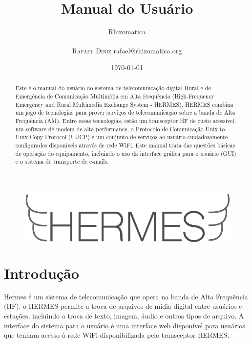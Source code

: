 \documentclass[11pt,a4paper]{article}
\title{Manual do Usuário}
\author{
       \large
       \mbox{Rhizomatica} \\
       \mbox{}\\
       \textsc{Rafael Diniz}
        rafael@rhizomatica.org\\
}
\date{\today}
\begin{document}
\maketitle

\begin{figure}[!ht]
\includegraphics[width=1\textwidth]{pictures/logoh.png}
\end{figure}

\begin{abstract}

Este é o manual do usuário do sistema de telecomunicação digital Rural e de Emergência de Comunicação Multimídia em Alta Frequência (High-Frequency Emergency and Rural Multimedia Exchange System - HERMES). HERMES combina um jogo de tecnologias para prover serviços de telecomunicação sobre a banda de Alta Frequência (AM). Entre essas tecnologias, estão um transceptor HF de custo acessível, um software de modem de alta performance, o Protocolo de Comunicação Unix-to-Unix Copy Protocol (UUCP) e um conjunto de serviços ao usuário cuidadosamente configurados disponíveis através de rede WiFi. Este manual trata das questões básicas de operação do equipamento, incluindo o uso da interface gráfica para o usuário (GUI) e o sistema de transporte de e-mails.

\end{abstract}

\newpage

\tableofcontents

\setlength{\parindent}{0em}
\setlength{\parskip}{1em}

\section{Introdução}

Hermes é um sistema de telecomunicação que opera na banda de Alta Frequência (HF). o HERMES permite a troca de arquivos de mídia digital entre usuários e estações, incluindo a troca de texto, imagem, áudio e outros tipos de arquivo. A interface do sistema para o usuário é uma interface web disponível para usuários que tenham acesso à rede WiFi disponibilizada pelo transceptor HERMES. 
\end{document}
